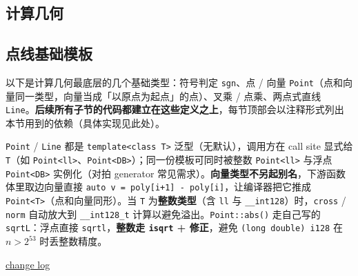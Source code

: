 	\begin{center}
		\section{计算几何}
	\end{center}

	\subsection{点线基础模板}

		以下是计算几何最底层的几个基础类型：符号判定 \texttt{sgn}、点 / 向量 \texttt{Point}（点和向量同一类型，向量当成「以原点为起点」的点）、叉乘 / 点乘、两点式直线 \texttt{Line}。\textbf{后续所有子节的代码都建立在这些定义之上}，每节顶部会以注释形式列出本节用到的依赖（具体实现见此处）。

		\texttt{Point} / \texttt{Line} 都是 \texttt{template<class T>} 泛型（无默认），调用方在 call site 显式给 \texttt{T}（如 \texttt{Point<ll>}、\texttt{Point<DB>}）；同一份模板可同时被整数 \texttt{Point<ll>} 与浮点 \texttt{Point<DB>} 实例化（对拍 generator 常见需求）。\textbf{向量类型不另起别名}，下游函数体里取边向量直接 \texttt{auto v = poly[i+1] - poly[i]}，让编译器把它推成 \texttt{Point<T>}（点和向量同形）。当 \texttt{T} 为\textbf{整数类型}（含 \texttt{ll} 与 \texttt{\_\_int128}）时，\texttt{cross} / \texttt{norm} 自动放大到 \texttt{\_\_int128\_t} 计算以避免溢出。\texttt{Point::abs()} 走自己写的 \texttt{sqrtL}：浮点直接 \texttt{sqrtl}，\textbf{整数走 \texttt{isqrt} + 修正}，避免 \texttt{(long double)\,i128} 在 $n > 2^{53}$ 时丢整数精度。

		\href{https://gist.github.com/znzryb/11d094702ccdb989efb8aed573ab0885}{change log}


